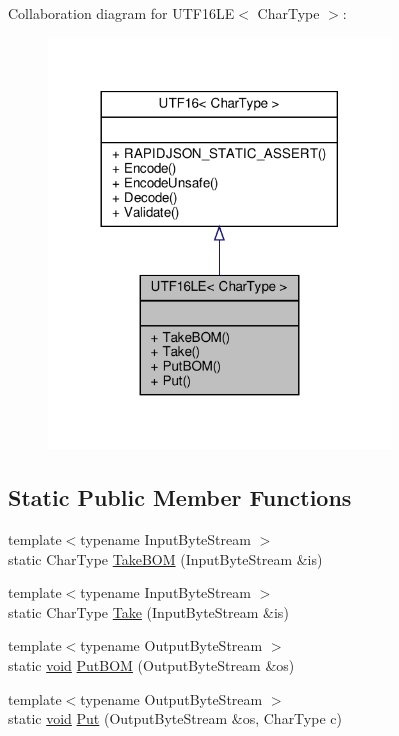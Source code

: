Collaboration diagram for U\+T\+F16\+LE$<$ Char\+Type $>$\+:
\nopagebreak
\begin{figure}[H]
\begin{center}
\leavevmode
\includegraphics[width=257pt]{structUTF16LE__coll__graph}
\end{center}
\end{figure}
\subsection*{Static Public Member Functions}
\begin{DoxyCompactItemize}
\item 
{\footnotesize template$<$typename Input\+Byte\+Stream $>$ }\\static Char\+Type \hyperlink{structUTF16LE_ab1d5f43903815155796733f76b21deea}{Take\+B\+OM} (Input\+Byte\+Stream \&is)
\item 
{\footnotesize template$<$typename Input\+Byte\+Stream $>$ }\\static Char\+Type \hyperlink{structUTF16LE_a5927b3d75ff9ce02056d827c14bd0160}{Take} (Input\+Byte\+Stream \&is)
\item 
{\footnotesize template$<$typename Output\+Byte\+Stream $>$ }\\static \hyperlink{imgui__impl__opengl3__loader_8h_ac668e7cffd9e2e9cfee428b9b2f34fa7}{void} \hyperlink{structUTF16LE_a6bfd05f8cac35c1594c7fce47009f198}{Put\+B\+OM} (Output\+Byte\+Stream \&os)
\item 
{\footnotesize template$<$typename Output\+Byte\+Stream $>$ }\\static \hyperlink{imgui__impl__opengl3__loader_8h_ac668e7cffd9e2e9cfee428b9b2f34fa7}{void} \hyperlink{structUTF16LE_ac018cc43a1dba5a6ca232bd9a257072c}{Put} (Output\+Byte\+Stream \&os, Char\+Type c)
\end{DoxyCompactItemize}
